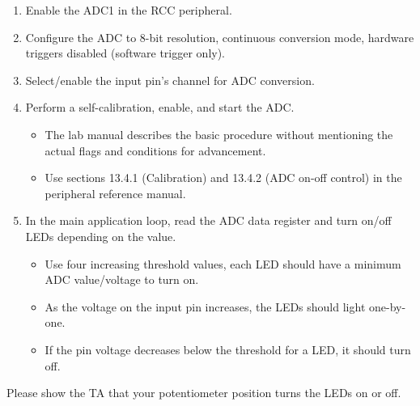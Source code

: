 \documentclass[openany,11pt,fleqn]{book} %
\begin{document}
\begin{exercise}
\begin{enumerate}
	    \item Enable the ADC1 in the RCC peripheral. 
	    \item Configure the ADC to 8-bit resolution, continuous conversion mode, hardware triggers disabled (software trigger only).
	    \item Select/enable the input pin's channel for ADC conversion.
	    \item Perform a self-calibration, enable, and start the ADC.
	    \begin{itemize}
	        \item The lab manual describes the basic procedure without mentioning the actual flags and conditions for advancement. 
	        \item Use sections 13.4.1 (Calibration) and 13.4.2 (ADC on-off control) in the peripheral reference manual. 
	    \end{itemize}
	    \item In the main application loop, read the ADC data register and turn on/off LEDs depending on the value.
	    \begin{itemize}
	        \item Use four increasing threshold values, each LED should have a minimum ADC value/voltage to turn on.
	        \item As the voltage on the input pin increases, the LEDs should light one-by-one.
	        \item If the pin voltage decreases below the threshold for a LED, it should turn off. 
	    \end{itemize}
	\end{enumerate}

\end{exercise}

\begin{assignment}
	Please show the TA that your potentiometer position turns the LEDs on or off.
\end{assignment}
\end{document}
